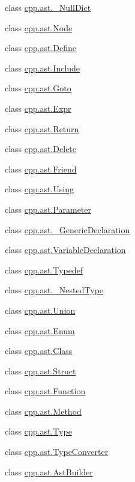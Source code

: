 \begin{DoxyCompactItemize}
\item 
class \mbox{\hyperlink{classcpp_1_1ast_1_1___null_dict}{cpp.\+ast.\+\_\+\+Null\+Dict}}
\item 
class \mbox{\hyperlink{classcpp_1_1ast_1_1_node}{cpp.\+ast.\+Node}}
\item 
class \mbox{\hyperlink{classcpp_1_1ast_1_1_define}{cpp.\+ast.\+Define}}
\item 
class \mbox{\hyperlink{classcpp_1_1ast_1_1_include}{cpp.\+ast.\+Include}}
\item 
class \mbox{\hyperlink{classcpp_1_1ast_1_1_goto}{cpp.\+ast.\+Goto}}
\item 
class \mbox{\hyperlink{classcpp_1_1ast_1_1_expr}{cpp.\+ast.\+Expr}}
\item 
class \mbox{\hyperlink{classcpp_1_1ast_1_1_return}{cpp.\+ast.\+Return}}
\item 
class \mbox{\hyperlink{classcpp_1_1ast_1_1_delete}{cpp.\+ast.\+Delete}}
\item 
class \mbox{\hyperlink{classcpp_1_1ast_1_1_friend}{cpp.\+ast.\+Friend}}
\item 
class \mbox{\hyperlink{classcpp_1_1ast_1_1_using}{cpp.\+ast.\+Using}}
\item 
class \mbox{\hyperlink{classcpp_1_1ast_1_1_parameter}{cpp.\+ast.\+Parameter}}
\item 
class \mbox{\hyperlink{classcpp_1_1ast_1_1___generic_declaration}{cpp.\+ast.\+\_\+\+Generic\+Declaration}}
\item 
class \mbox{\hyperlink{classcpp_1_1ast_1_1_variable_declaration}{cpp.\+ast.\+Variable\+Declaration}}
\item 
class \mbox{\hyperlink{classcpp_1_1ast_1_1_typedef}{cpp.\+ast.\+Typedef}}
\item 
class \mbox{\hyperlink{classcpp_1_1ast_1_1___nested_type}{cpp.\+ast.\+\_\+\+Nested\+Type}}
\item 
class \mbox{\hyperlink{classcpp_1_1ast_1_1_union}{cpp.\+ast.\+Union}}
\item 
class \mbox{\hyperlink{classcpp_1_1ast_1_1_enum}{cpp.\+ast.\+Enum}}
\item 
class \mbox{\hyperlink{classcpp_1_1ast_1_1_class}{cpp.\+ast.\+Class}}
\item 
class \mbox{\hyperlink{classcpp_1_1ast_1_1_struct}{cpp.\+ast.\+Struct}}
\item 
class \mbox{\hyperlink{classcpp_1_1ast_1_1_function}{cpp.\+ast.\+Function}}
\item 
class \mbox{\hyperlink{classcpp_1_1ast_1_1_method}{cpp.\+ast.\+Method}}
\item 
class \mbox{\hyperlink{classcpp_1_1ast_1_1_type}{cpp.\+ast.\+Type}}
\item 
class \mbox{\hyperlink{classcpp_1_1ast_1_1_type_converter}{cpp.\+ast.\+Type\+Converter}}
\item 
class \mbox{\hyperlink{classcpp_1_1ast_1_1_ast_builder}{cpp.\+ast.\+Ast\+Builder}}
\end{DoxyCompactItemize}
